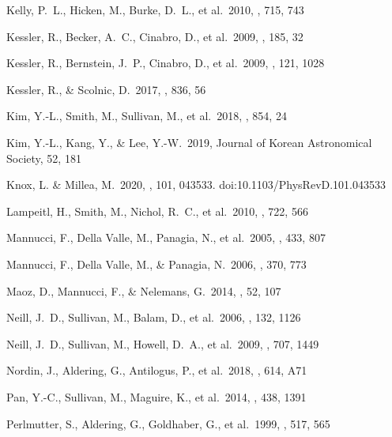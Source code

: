 \documentclass[]{aa}
\begin{document}
\begin{thebibliography}{}

 Kelly, P.~L., Hicken, M., Burke, D.~L.,
et al.\ 2010, \apj, 715, 743

 Kessler, R., Becker, A.~C., Cinabro,
D., et al.\ 2009, \apjs, 185, 32

 Kessler, R., Bernstein, J.~P., Cinabro,
D., et al.\ 2009, \pasp, 121, 1028

 Kessler, R., \& Scolnic, D.\
2017, \apj, 836, 56

 Kim, Y.-L., Smith, M., Sullivan, M., et al.\
2018, \apj, 854, 24

 Kim, Y.-L., Kang, Y., \& Lee, Y.-W.\ 2019,
Journal of Korean Astronomical Society, 52, 181

 Knox, L. \& Millea, M.\ 2020, \prd,
101, 043533. doi:10.1103/PhysRevD.101.043533


 Lampeitl, H., Smith, M., Nichol,
R.~C., et al.\ 2010, \apj, 722, 566


 Mannucci, F., Della Valle, M.,
Panagia, N., et al.\ 2005, \aap, 433, 807 

 Mannucci, F., Della Valle, M., \&
Panagia, N.\ 2006, \mnras, 370, 773 

 Maoz, D., Mannucci, F., \&
Nelemans, G.\ 2014, \araa, 52, 107 



 Neill, J.~D., Sullivan, M., Balam, D.,
et al.\ 2006, \aj, 132, 1126

 Neill, J.~D., Sullivan, M., Howell,
D.~A., et al.\ 2009, \apj, 707, 1449

 Nordin, J., Aldering, G., Antilogus,
P., et al.\ 2018, \aap, 614, A71


 Pan, Y.-C., Sullivan, M., Maguire, K., et
al.\ 2014, \mnras, 438, 1391

 Perlmutter, S., Aldering, G.,
Goldhaber, G., et al.\ 1999, \apj, 517, 565


\end{thebibliography}
\end{document}
